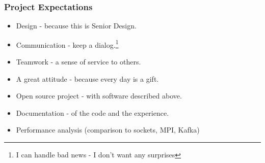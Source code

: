 \documentclass[xcolor=svgnames]{beamer}
\begin{document}
\begin{frame}[fragile]
  \frametitle{Project Expectations}

\begin{itemize}
\item Design - because this is Senior Design.
\item Communication - keep a dialog.\footnote{I can handle bad news - I don't want any surprises}
\item Teamwork - a sense of service to others.
\item A great attitude - because every day is a gift.
\item Open source project - with software described above.
\item Documentation - of the code and the experience.
\item Performance analysis (comparison to sockets, MPI, Kafka)
\end{itemize}

\end{frame}
\end{document}
